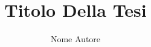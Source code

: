 \documentclass[12pt,a4paper,openany,oneside]{book}
\begin{document}




\title{Titolo Della Tesi}
\author{Nome Autore}



\tableofcontents









\newpage
{}

\end{document}
